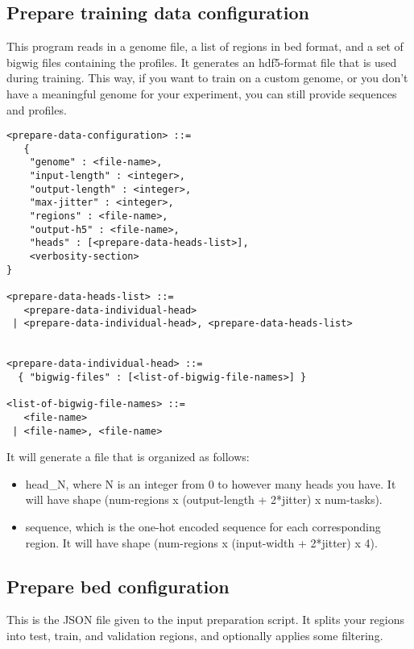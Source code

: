 \documentclass{article}
\begin{document}
\subsection{Prepare training data configuration}
This program reads in a genome file, a list of regions in bed format, and a set of bigwig files containing the profiles. It generates an hdf5-format file that is used during training. This way, if you want to train on a custom genome, or you don't have a meaningful genome for your experiment, you can still provide sequences and profiles. 

\begin{lstlisting}
<prepare-data-configuration> ::=
   {
    "genome" : <file-name>,
    "input-length" : <integer>,
    "output-length" : <integer>,
    "max-jitter" : <integer>,
    "regions" : <file-name>,
    "output-h5" : <file-name>,
    "heads" : [<prepare-data-heads-list>],
    <verbosity-section>
}

<prepare-data-heads-list> ::=
   <prepare-data-individual-head>
 | <prepare-data-individual-head>, <prepare-data-heads-list>


<prepare-data-individual-head> ::=
  { "bigwig-files" : [<list-of-bigwig-file-names>] }

<list-of-bigwig-file-names> ::= 
   <file-name>
 | <file-name>, <file-name>

\end{lstlisting}



It will generate a file that is organized as follows:
\begin{itemize}
    \item head\_N, where N is an integer from 0 to however many heads you have. It will have shape (num-regions x (output-length + 2*jitter) x num-tasks). 
    \item sequence, which is the one-hot encoded sequence for each corresponding region. It will have shape (num-regions x (input-width + 2*jitter) x 4). 
\end{itemize}




\subsection{Prepare bed configuration}

This is the JSON file given to the input preparation script. It splits your regions into 
test, train, and validation regions, and optionally applies some filtering. 
\end{document}
